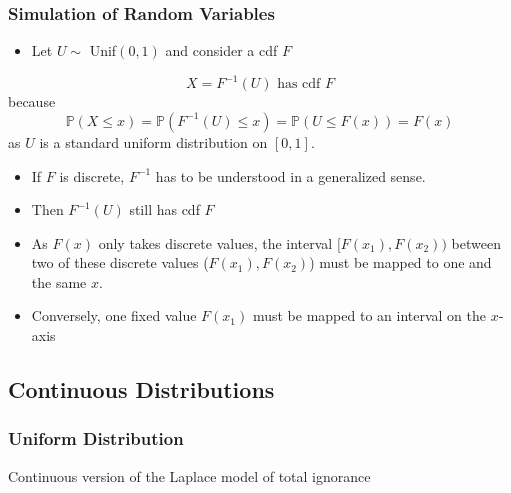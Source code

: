 \subsubsection{Simulation of Random Variables}

\begin{itemize}
    \item Let $U\sim$ Unif$(0,1)$ and consider a cdf $F$
\end{itemize}
\begin{equation*}
    X=F^{-1}(U) \text{ has cdf }F
\end{equation*}
because
\begin{equation*}
    \mathbb{P}(X\leq x)=\mathbb{P}(F^{-1}(U)\leq x)=\mathbb{P}(U\leq F(x))=F(x)
\end{equation*}
as $U$ is a standard uniform distribution on $[0,1]$.


\begin{itemize}
    \item If $F$ is discrete, $F^{-1}$ has to be understood in a generalized sense.
    \item Then $F^{-1}(U)$ still has cdf $F$
    \item As $F(x)$ only takes discrete values, the interval $[F(x_1), F(x_2))$ between two of these discrete values ($F(x_1), F(x_2)$) must be mapped to one and the same $x$. %
    \item Conversely, one fixed value $F(x_1)$ must be mapped to an interval on the $x$-axis
\end{itemize}

\subsection{Continuous Distributions}

\newcol{}

\subsubsection{Uniform Distribution}
Continuous version of the Laplace model of total ignorance

\renewcommand{\arraystretch}{1.3}
\setlength{\oldtabcolsep}{\tabcolsep}\setlength\tabcolsep{0pt}

